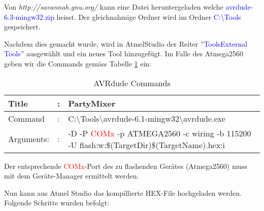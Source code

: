 Von \textit{http://savannah.gnu.org/} kann eine Datei heruntergeladen welche \textcolor{blue}{avrdude-6.3-mingw32.zip} heisst. Der gleichnahmige Ordner wird im Ordner \textcolor{blue}{C:\textbackslash Tools} gespeichert. \cite{savannahgnuorg_index_2016}

Nachdem dies gemacht wurde, wird in AtmelStudio der Reiter ''\textcolor{blue}{Tools\textrightarrow External Tools}'' ausgewählt und ein neues Tool hinzugefügt. Im Falle des Atmega2560 geben wir die Commands gemäss Tabelle \ref{tab:AVRdude_commands} ein:


\begin{table}[h!]
\center
\begin{tabularx}{\textwidth}{|l|l|X|}
\hline
Title & : & PartyMixer \\
\hline
Command & : & C:\textbackslash Tools\textbackslash avrdude-6.1-mingw32\textbackslash avrdude.exe \\
\hline
Arguments: & : & -D -P \textcolor{red}{ COMx} -p ATMEGA2560 -c wiring -b 115200 -U flash:w:\$(TargetDir)\$(TargetName).hex:i\\
\hline
\end{tabularx}
\caption{AVRdude Commands}
\label{tab:AVRdude_commands}
\end{table}

Der entsprechende \textcolor{red}{ COMx}-Port des zu flashenden Gerätes (Atmega2560) muss mit dem Geräte-Manager ermittelt werden. \cite{meier_mc1-skript_2017}

Nun kann aus Atmel Studio das kompillierte HEX-File hochgeladen werden.
\newpage
Folgende Schritte wurden befolgt:

